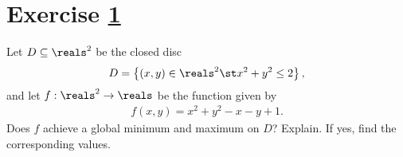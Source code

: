 %
%
%
%

\section{Exercise \ref{sec: Math212 2016 Fall HalfExam02Q11}}
\label{sec: Math212 2016 Fall HalfExam02Q11}

Let $D \subseteq \reals^{2}$ be the closed disc
\begin{align*}
D
=
\left\{(x,y) \in \reals^{2} \st x^{2} + y^{2} \leq 2\right\},
\end{align*}
and let $f: \reals^{2} \rightarrow \reals$ be the function given by
\begin{align*}
f(x,y)
=
x^{2} + y^{2} - x - y + 1.
\end{align*}
Does $f$ achieve a global minimum and maximum on $D$? Explain. If yes, find the corresponding values.

